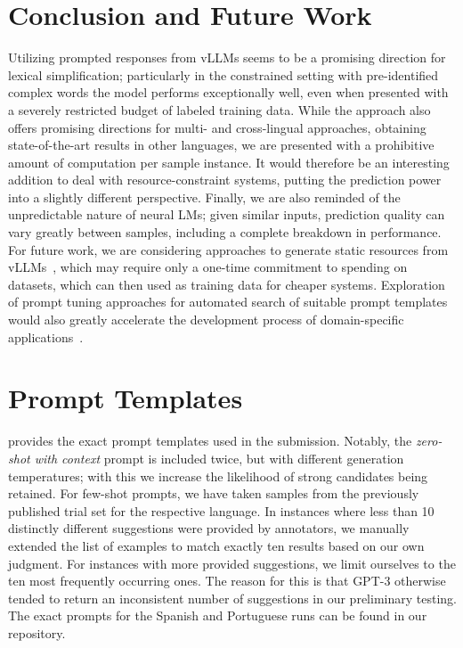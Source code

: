 \documentclass[11pt]{article}
\newcommand{\todo}[1]{\textcolor{red}{TODO: #1}}
\begin{document}
\section{Conclusion and Future Work}
Utilizing prompted responses from vLLMs seems to be a promising direction for lexical simplification; particularly in the constrained setting with pre-identified complex words the model performs exceptionally well, even when presented with a severely restricted budget of labeled training data.
While the approach also offers promising directions for multi- and cross-lingual approaches, obtaining state-of-the-art results in other languages, we are presented with a prohibitive amount of computation per sample instance.
It would therefore be an interesting addition to deal with resource-constraint systems, putting the prediction power into a slightly different perspective.
Finally, we are also reminded of the unpredictable nature of neural LMs; given similar inputs, prediction quality can vary greatly between samples, including a complete breakdown in performance.\\
For future work, we are considering approaches to generate static resources from vLLMs~\cite{schick-schutze-2021-generating}, which may require only a one-time commitment to spending on datasets, which can then used as training data for cheaper systems.
Exploration of prompt tuning approaches for automated search of suitable prompt templates would also greatly accelerate the development process of domain-specific applications~\cite{lester-etal-2021-power}.





\appendix
\newpage

\section{Prompt Templates}
\label{sec:prompts}

 provides the exact prompt templates used in the submission. Notably, the \emph{zero-shot with context} prompt is included twice, but with different generation temperatures; with this we increase the likelihood of strong candidates being retained.
For few-shot prompts, we have taken samples from the previously published trial set for the respective language. In instances where less than 10 distinctly different suggestions were provided by annotators, we manually extended the list of examples to match exactly ten results based on our own judgment. For instances with more provided suggestions, we limit ourselves to the ten most frequently occurring ones. The reason for this is that GPT-3 otherwise tended to return an inconsistent number of suggestions in our preliminary testing. The exact prompts for the Spanish and Portuguese runs can be found in our repository.
\end{document}
